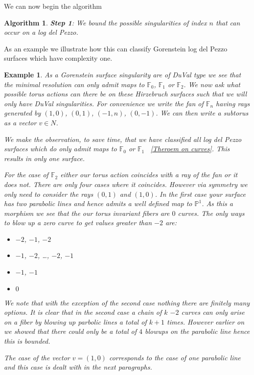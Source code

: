 \documentclass[11pt]{amsart}
\theoremstyle{plain}
\newtheorem{ex}[thm]{Example}
\newtheorem{algorithm}[thm]{Algorithm}
\newcommand{\mb}[1]{\mathbb{#1}}
\begin{document}
We can now begin the algorithm

\begin{algorithm}
\textbf{Step 1}: We bound the possible singularities of index $n$ that can occur on a log del Pezzo. 
\end{algorithm}

As an example we illustrate how this can classify Gorenstein log del Pezzo surfaces which have complexity one.

\begin{ex}
As a Gorenstein surface singularity are of DuVal type we see that the minimal resolution can only admit maps to $\mb{F}_0$, $\mb{F}_1$ or $\mb{F}_2$. We now ask what possible torus actions can there be on these Hirzebruch surfaces such that we will only have DuVal singularities. For convenience we write the fan of $\mb{F}_n$ having rays generated by $(1,0)$, $(0,1)$, $(-1, n)$, $(0,-1)$. We can then write a subtorus as a vector $v \in N$.


We make the observation, to save time, that we have classified all log del Pezzo surfaces which do only admit maps to $\mb{F}_0$ or $\mb{F}_1$ ~\ref{Theroem on curves}. This results in only one surface.


For the case of $\mb{F}_2$ either our torus action coincides with a ray of the fan or it does not. There are only four cases where it coincides. However via symmetry we only need to consider the rays $(0,1)$ and $(1,0)$. In the first case your surface has two parabolic lines and hence admits a well defined map to $\mb{P}^1$. As this a morphism we see that the our torus invariant fibers are $0$ curves. The only ways to blow up a zero curve to get values greater than $-2$ are:
\begin{itemize}
\item $-2$, $-1$, $-2$
\item $-1$, $-2$, \dots , $-2$, $-1$
\item $-1$, $-1$
\item $0$
\end{itemize}
We note that with the exception of the second case nothing there are finitely many options. It is clear that in the second case a chain of $k$ $-2$ curves can only arise on a fiber by blowing up parbolic lines a total of $k+1$ times. However earlier on we showed that there could only be a total of $4$ blowups on the parabolic line hence this is bounded.  


The case of the vector $v = (1,0)$ corresponds to the case of one parabolic line and this case is dealt with in the next paragraphs.



\end{ex}
\end{document}
